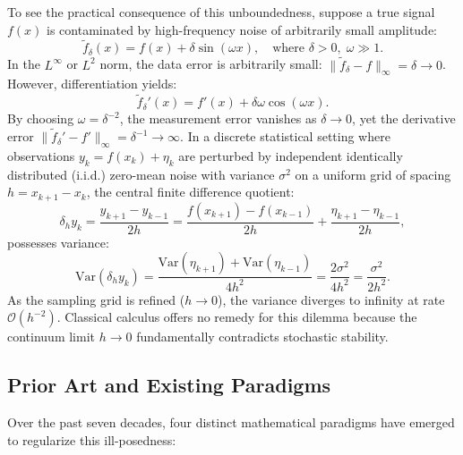 \documentclass[11pt,a4paper]{article}
\theoremstyle{definition}
\begin{document}
To see the practical consequence of this unboundedness, suppose a true signal $f(x)$ is contaminated by high-frequency noise of arbitrarily small amplitude:
\begin{equation}
\tilde{f}_\delta(x) = f(x) + \delta \sin(\omega x), \quad \text{where } \delta > 0, \; \omega \gg 1.
\end{equation}
In the $L^\infty$ or $L^2$ norm, the data error is arbitrarily small: $\|\tilde{f}_\delta - f\|_\infty = \delta \to 0$. However, differentiation yields:
\begin{equation}
\tilde{f}_\delta'(x) = f'(x) + \delta \omega \cos(\omega x).
\end{equation}
By choosing $\omega = \delta^{-2}$, the measurement error vanishes as $\delta \to 0$, yet the derivative error $\|\tilde{f}_\delta' - f'\|_\infty = \delta^{-1} \to \infty$. In a discrete statistical setting where observations $y_k = f(x_k) + \eta_k$ are perturbed by independent identically distributed (i.i.d.) zero-mean noise with variance $\sigma^2$ on a uniform grid of spacing $h = x_{k+1} - x_k$, the central finite difference quotient:
\begin{equation}
\delta_h y_k = \frac{y_{k+1} - y_{k-1}}{2h} = \frac{f(x_{k+1}) - f(x_{k-1})}{2h} + \frac{\eta_{k+1} - \eta_{k-1}}{2h},
\end{equation}
possesses variance:
\begin{equation}
\text{Var}(\delta_h y_k) = \frac{\text{Var}(\eta_{k+1}) + \text{Var}(\eta_{k-1})}{4h^2} = \frac{2\sigma^2}{4h^2} = \frac{\sigma^2}{2h^2}.
\end{equation}
As the sampling grid is refined ($h \to 0$), the variance diverges to infinity at rate $\mathcal{O}(h^{-2})$. Classical calculus offers no remedy for this dilemma because the continuum limit $h \to 0$ fundamentally contradicts stochastic stability.

\subsection{Prior Art and Existing Paradigms}
Over the past seven decades, four distinct mathematical paradigms have emerged to regularize this ill-posedness:
\end{document}
